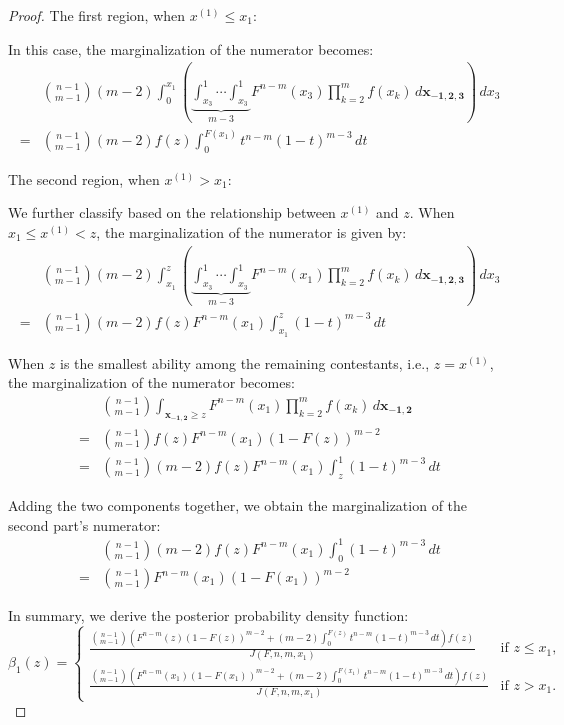 \begin{proof}
The first region, when \( x^{(1)} \leq x_1 \):

In this case, the marginalization of the numerator becomes:
\[
\begin{aligned}
    & \binom{n-1}{m-1}(m-2)\int_0^{x_1} \left( \underbrace{\int_{x_3}^{1} \cdots \int_{x_3}^{1}}_{m-3} F^{n-m}(x_3) \prod_{k=2}^m f(x_k) \, d\mathbf{x_{-1,2,3}}\right) \, dx_3 \\
    = & \binom{n-1}{m-1}(m-2)f(z)\int_0^{F(x_1)} t^{n-m}(1-t)^{m-3} \, dt
\end{aligned}
\]

The second region, when \( x^{(1)} > x_1 \):

We further classify based on the relationship between \( x^{(1)} \) and \( z \). When \( x_1 \leq x^{(1)} < z \), the marginalization of the numerator is given by:
\[
\begin{aligned}
    & \binom{n-1}{m-1}(m-2)\int_{x_1}^{z} \left( \underbrace{\int_{x_3}^{1} \cdots \int_{x_3}^{1}}_{m-3} F^{n-m}(x_1) \prod_{k=2}^m f(x_k) \, d\mathbf{x_{-1,2,3}}\right) \, dx_3 \\
    = & \binom{n-1}{m-1}(m-2)f(z)F^{n-m}(x_1)\int_{x_1}^{z} (1-t)^{m-3}\, dt
\end{aligned}
\]

When \( z \) is the smallest ability among the remaining contestants, i.e., \( z = x^{(1)} \), the marginalization of the numerator becomes:
\[
\begin{aligned}
    & \binom{n-1}{m-1}\int_{\mathbf{x_{-1,2}} \geq z} F^{n-m}(x_1)  \prod_{k=2}^m f(x_k) \, d\mathbf{x_{-1,2}}\\
    = & \binom{n-1}{m-1}f(z)F^{n-m}(x_1)(1-F(z))^{m-2} \\
    = & \binom{n-1}{m-1}(m-2)f(z)F^{n-m}(x_1)\int_z^{1} (1-t)^{m-3} \, dt
\end{aligned}
\]

Adding the two components together, we obtain the marginalization of the second part's numerator: 
\[
\begin{aligned}
    & \binom{n-1}{m-1}(m-2)f(z)F^{n-m}(x_1)\int_0^{1} (1-t)^{m-3} \, dt \\
    = & \binom{n-1}{m-1} F^{n-m}(x_1)(1-F(x_1))^{m-2}
\end{aligned}
\]

In summary, we derive the posterior probability density function:
\[
\beta_1(z) =   
\begin{cases} 
\frac{\binom{n-1}{m-1}\left( F^{n-m}(z)(1-F(z))^{m-2}+(m-2)\int_0^{F(z)}t^{n-m}(1-t)^{m-3}\, dt \right)f(z)}{J(F,n,m,x_1)} & \text{if } z \leq x_1, \\
\frac{\binom{n-1}{m-1}\left(  F^{n-m}(x_1)(1-F(x_1))^{m-2} +(m-2)\int_0^{F(x_1)} t^{n-m}(1-t)^{m-3}\, dt \right) f(z)}{J(F,n,m,x_1)} & \text{if } z > x_1.
\end{cases}
\]


\end{proof}
